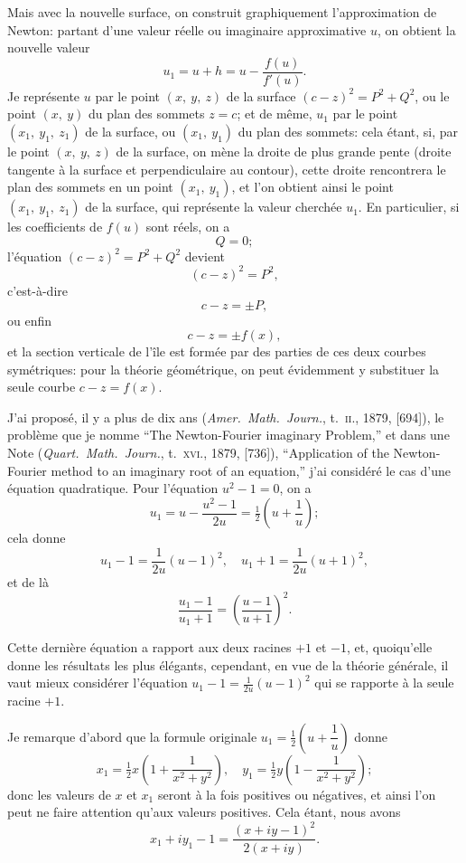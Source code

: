 \documentclass[11pt,a4paper]{article}
\begin{document}
Mais avec la nouvelle surface, on construit graphiquement l'approximation de Newton: partant d'une valeur réelle ou imaginaire approximative $u$, on obtient la nouvelle valeur
\[
u_1 = u + h = u - \frac{f(u)}{f'(u)}.
\]
Je représente $u$ par le point $(x,\ y,\ z)$ de la surface $(c - z)^2 = P^2 + Q^2$, ou le point $(x,\ y)$ du plan des sommets $z = c$; et de même, $u_1$ par le point $(x_1,\ y_1,\ z_1)$ de la surface, ou $(x_1,\ y_1)$ du plan des sommets: cela étant, si, par le point $(x,\ y,\ z)$ de la surface, on mène la droite de plus grande pente (droite tangente à la surface et perpendiculaire au contour), cette droite rencontrera le plan des sommets en un point $(x_1,\ y_1)$, et l'on obtient ainsi le point $(x_1,\ y_1,\ z_1)$ de la surface, qui représente la valeur cherchée $u_1$. En particulier, si les coefficients de $f(u)$ sont réels, on a
\[
Q = 0;
\]
l'équation $(c - z)^2 = P^2 + Q^2$ devient
\[
(c - z)^2 = P^2,
\]
c'est-à-dire
\[
c - z = \pm P,
\]
ou enfin
\[
c - z = \pm f(x),
\]
et la section verticale de l'île est formée par des parties de ces deux courbes symétriques: pour la théorie géométrique, on peut évidemment y substituer la seule courbe $c - z = f(x)$.

J'ai proposé, il y a plus de dix ans (\emph{Amer.\ Math.\ Journ.}, t.\ \textsc{ii}., 1879, [694]), le problème que je nomme ``The Newton-Fourier imaginary Problem,'' et dans une Note (\emph{Quart.\ Math.\ Journ.}, t.\ \textsc{xvi}., 1879, [736]), ``Application of the Newton-Fourier method to an imaginary root of an equation,'' j'ai considéré le cas d'une équation quadratique. Pour l'équation $u^2 - 1 = 0$, on a
\[
u_1 = u - \frac{u^2 - 1}{2u} = \tfrac{1}{2}\left(u + \frac{1}{u}\right);
\]
cela donne
\[
u_1 - 1 = \frac{1}{2u}(u - 1)^2,\quad u_1 + 1 = \frac{1}{2u}(u + 1)^2,
\]
et de là
\[
\frac{u_1 - 1}{u_1 + 1} = \left(\frac{u - 1}{u + 1}\right)^2.
\]

Cette dernière équation a rapport aux deux racines $+1$ et $-1$, et, quoiqu'elle donne les résultats les plus élégants, cependant, en vue de la théorie générale, il vaut mieux considérer l'équation $u_1 - 1 = \frac{1}{2u}(u - 1)^2$ qui se rapporte à la seule racine $+1$.

Je remarque d'abord que la formule originale $u_1 = \tfrac{1}{2}\!\left(u + \dfrac{1}{u}\right)$ donne
\[
x_1 = \tfrac{1}{2} x\!\left(1 + \frac{1}{x^2 + y^2}\right),\quad y_1 = \tfrac{1}{2} y\!\left(1 - \frac{1}{x^2 + y^2}\right);
\]
donc les valeurs de $x$ et $x_1$ seront à la fois positives ou négatives, et ainsi l'on peut ne faire attention qu'aux valeurs positives. Cela étant, nous avons
\[
x_1 + i y_1 - 1 = \frac{(x + iy - 1)^2}{2(x + iy)}.
\]
\end{document}
